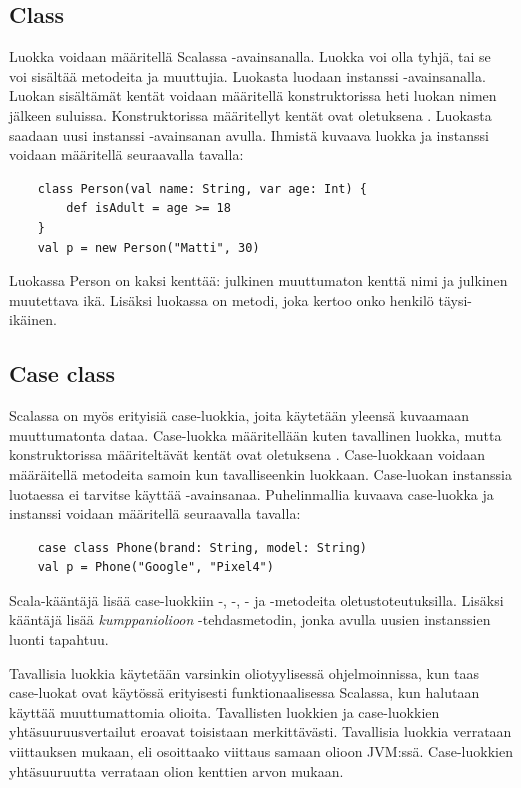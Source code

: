 \subsection{Class} \label{class}
Luokka voidaan määritellä Scalassa -avainsanalla. Luokka voi olla tyhjä, tai se voi sisältää metodeita ja muuttujia. Luokasta luodaan instanssi -avainsanalla. Luokan sisältämät kentät voidaan määritellä konstruktorissa heti luokan nimen jälkeen suluissa. Konstruktorissa määritellyt kentät ovat oletuksena . Luokasta saadaan uusi instanssi -avainsanan avulla. Ihmistä kuvaava luokka ja instanssi voidaan määritellä seuraavalla tavalla:
\begin{lstlisting}
    class Person(val name: String, var age: Int) {
        def isAdult = age >= 18
    }
    val p = new Person("Matti", 30)
\end{lstlisting}
Luokassa Person on kaksi kenttää: julkinen muuttumaton kenttä nimi ja julkinen muutettava ikä. Lisäksi luokassa on metodi, joka kertoo onko henkilö täysi-ikäinen.
\cite[Classes]{tourOfScala}


\subsection{Case class} \label{caseclass}
Scalassa on myös erityisiä case-luokkia, joita käytetään yleensä kuvaamaan muuttumatonta dataa. Case-luokka määritellään kuten tavallinen luokka, mutta konstruktorissa määriteltävät kentät ovat oletuksena . Case-luokkaan voidaan määräitellä metodeita samoin kun tavalliseenkin luokkaan. Case-luokan instanssia luotaessa ei tarvitse käyttää -avainsanaa. Puhelinmallia kuvaava case-luokka ja instanssi voidaan määritellä seuraavalla tavalla:
\begin{lstlisting}
    case class Phone(brand: String, model: String)
    val p = Phone("Google", "Pixel4")
\end{lstlisting}
Scala-kääntäjä lisää case-luokkiin -, -, - ja -metodeita oletustoteutuksilla. Lisäksi kääntäjä lisää \textit{kumppaniolioon} -tehdasmetodin, jonka avulla uusien instanssien luonti tapahtuu.
\cite[Luku 15]{prorgrammingInScala3rd}

Tavallisia luokkia käytetään varsinkin oliotyylisessä ohjelmoinnissa, kun taas case-luokat ovat käytössä erityisesti funktionaalisessa Scalassa, kun halutaan käyttää muuttumattomia olioita. Tavallisten luokkien ja case-luokkien yhtäsuuruusvertailut eroavat toisistaan merkittävästi. Tavallisia luokkia verrataan viittauksen mukaan, eli osoittaako viittaus samaan olioon JVM:ssä. Case-luokkien yhtäsuuruutta verrataan olion kenttien arvon mukaan.
\cite[Luku 15]{prorgrammingInScala3rd}

